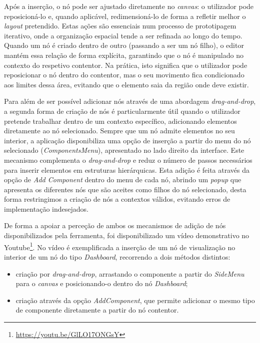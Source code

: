 Após a inserção, o nó pode ser ajustado diretamente no \textit{canvas}: o utilizador pode reposicioná-lo e, quando aplicável, redimensioná-lo de forma a refletir melhor o \textit{layout} pretendido. Estas ações são essenciais num processo de prototipagem iterativo, onde a organização espacial tende a ser refinada ao longo do tempo. Quando um nó é criado dentro de outro (passando a ser um nó filho), o editor mantém essa relação de forma explícita, garantindo que o nó é manipulado no contexto do respetivo contentor. Na prática, isto significa que o utilizador pode reposicionar o nó dentro do contentor, mas o seu movimento fica condicionado aos limites dessa área, evitando que o elemento saia da região onde deve existir.

Para além de ser possível adicionar nós através de uma abordagem \textit{drag-and-drop}, a segunda forma de criação de nós é particularmente útil quando o utilizador pretende trabalhar dentro de um contexto específico, adicionando elementos diretamente ao nó selecionado. Sempre que um nó admite elementos no seu interior, a aplicação disponibiliza uma opção de inserção a partir do menu do nó selecionado (\textit{ComponentsMenu}), apresentado no lado direito da interface. Este mecanismo complementa o \textit{drag-and-drop} e reduz o número de passos necessários para inserir elementos em estruturas hierárquicas. Esta adição é feita através da opção de \textit{Add Component} dentro do menu de cada nó, abrindo um \textit{popup} que apresenta os diferentes nós que são aceites como filhos do nó selecionado, desta forma restringimos a criação de nós a contextos válidos, evitando erros de implementação indesejados.
 
De forma a apoiar a perceção de ambos os mecanismos de adição de nós disponibilizados pela ferramenta, foi disponibilizado um vídeo demonstrativo no Youtube\footnote{\url{https://youtu.be/GlLO17ONGsY}}. No vídeo é exemplificada a inserção de um nó de visualização no interior de um nó do tipo \textit{Dashboard}, recorrendo a dois métodos distintos:

\begin{itemize}
    \item criação por \textit{drag-and-drop}, arrastando o componente a partir do \textit{SideMenu} para o \textit{canvas} e posicionando-o dentro do nó \textit{Dashboard};
    \item criação através da opção \textit{AddComponent}, que permite adicionar o mesmo tipo de componente diretamente a partir do nó contentor.
\end{itemize}

